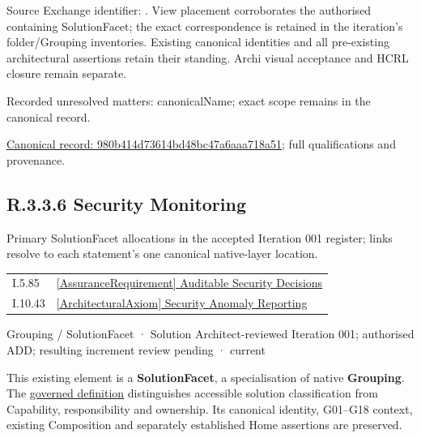 Source Exchange identifier: \texttt{}. View placement corroborates
the authorised containing SolutionFacet; the exact correspondence is retained in the
iteration's folder/Grouping inventories. Existing canonical identities and all
pre-existing architectural assertions retain their standing. Archi visual
acceptance and HCRL closure remain separate.


{\small Recorded unresolved matters: canonicalName; exact scope remains in the canonical record.}\par
{\footnotesize \href{../../../../../../../continuum/grouping/980b414d73614bd48bc47a6aaa718a51.md}{Canonical record: 980b414d73614bd48bc47a6aaa718a51}; full qualifications and provenance.}\par
\subsection*{R.3.3.6 Security Monitoring}
\label{navigation:R.3.3.6}

Primary SolutionFacet allocations in the accepted Iteration 001 register; links resolve to each statement’s one canonical native-layer location.\par
\begin{longtable}{p{.22\linewidth}p{.73\linewidth}}
I.5.85 & \hyperref[element:92ef574eb9b945dfaf6cf2b1b670595b]{[AssuranceRequirement] Auditable Security Decisions} \\
I.10.43 & \hyperref[element:859f884874094c96a6ace15e17131a4c]{[ArchitecturalAxiom] Security Anomaly Reporting} \\
\end{longtable}
\label{element:bb3adbc3c2fb43e6a18a876c4e897c9c}
{\small Grouping / SolutionFacet · Solution Architect-reviewed Iteration 001; authorised ADD; resulting increment review pending · current}\par

This existing element is a \textbf{SolutionFacet}, a specialisation of native
\textbf{Grouping}. The \href{\detokenize{../../../../../../../governance/continuum-representation.md#solutionfacet-classification--1119-candidate}}{governed definition}
distinguishes accessible solution classification from Capability, responsibility
and ownership. Its canonical identity, G01–G18 context, existing Composition
and separately established Home assertions are preserved.



